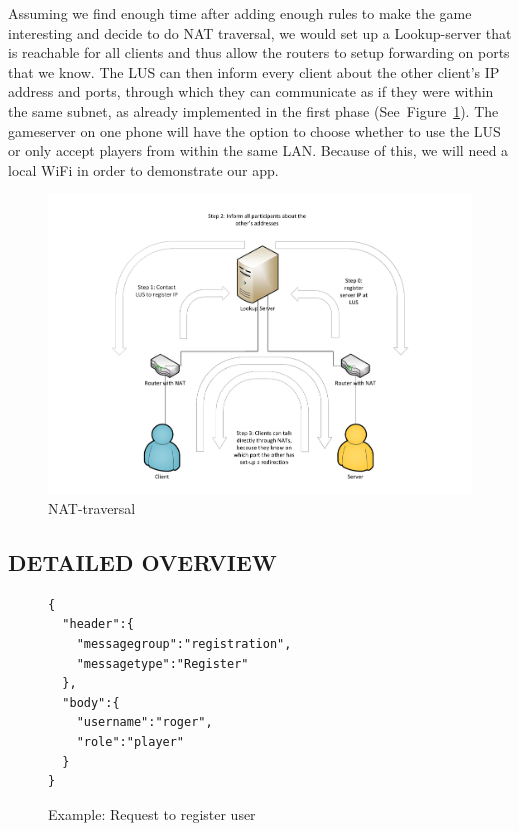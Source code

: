 \documentclass{report}
\newcommand{\lfig}[1]{\label{fig:#1}}
\newcommand{\rfig}[1]{Figure~\ref{fig:#1}}
\begin{document}
Assuming we find enough time after adding enough rules to make the game interesting and decide to do NAT traversal, we would set up a Lookup-server that is reachable for all clients and thus allow the routers to setup forwarding on ports that we know. The LUS can then inform every client about the other client's IP address and ports, through which they can communicate as if they were within the same subnet, as already implemented in the first phase (See~\rfig{nat}). The gameserver on one phone will have the option to choose whether to use the LUS or only accept players from within the same LAN.
Because of this, we will need a local WiFi in order to demonstrate our app.\\
\begin{figure}[h]
	\centering
    \includegraphics[width=\columnwidth]{NATholepunching.pdf}
    \vspace{-5mm} %
	\caption{NAT-traversal}
    \lfig{nat}
\end{figure}
\subsection{DETAILED OVERVIEW}
\begin{figure}
\begin{verbatim}
{
  "header":{
    "messagegroup":"registration",
    "messagetype":"Register"
  },
  "body":{
    "username":"roger",
    "role":"player"
  }
}
\end{verbatim}
\caption{Example: Request to register user}
\lfig{regmsg}
\end{figure}
\end{document}

